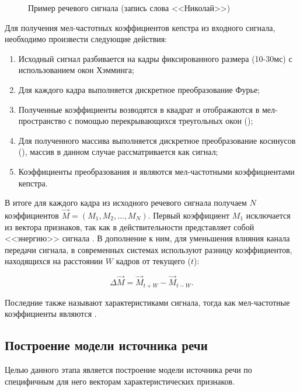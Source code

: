\begin{figure}[h!]
\caption{Пример речевого сигнала (запись слова <<Николай>>)}
\label{fig:waveform}
\end{figure}

Для получения мел-частотных коэффициентов кепстра из входного сигнала, необходимо произвести следующие действия:

\begin{enumerate}
\item Исходный сигнал разбивается на кадры фиксированного размера (10-30мс) с использованием окон Хэмминга;
\item Для каждого кадра выполняется дискретное преобразование Фурье;
\item Полученные коэффициенты возводятся в квадрат и отображаются в мел-пространство с помощью перекрывающихся треугольных окон ();
\item Для полученного массива выполняется дискретное преобразование косинусов (), массив в данном случае рассматривается как сигнал;
\item Коэффициенты преобразования и являются мел-частотными коэффициентами кепстра.
\end{enumerate}

В итоге для каждого кадра из исходного речевого сигнала получаем $N$ коэффициентов $\vec M = (M_1, M_2, \ldots, M_N)$. Первый коэффициент $M_1$ исключается из вектора признаков, так как в действительности представляет собой <<энергию>> сигнала \cite{Reynolds95gmm}. В дополнение к ним, для уменьшения влияния канала передачи сигнала, в современных системах используют \cite{Reynolds95gmm} разницу коэффициентов, находящихся на расстоянии $W$ кадров от текущего ($t$):

\begin{equation}
\Delta \vec M = \vec M_{t+W} - \vec M_{t-W}.
\end{equation}

Последние также называют  характеристиками сигнала, тогда как мел-частотные коэффициенты являются .

\subsection{Построение модели источника речи}

Целью данного этапа является построение модели источника речи по специфичным для него векторам характеристических признаков.

